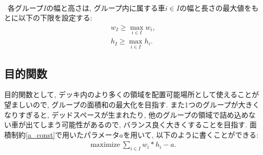 \\
\ 各グループ$I$の幅と高さは, グループ内に属する車$i \in I$の幅と長さの最大値をもとに以下の下限を設定する: \\
\begin{eqnarray}
    w_I \geq \max_{i \in I} w_i, \\
    h_I \geq \max_{i \in I} h_i. 
\end{eqnarray}


\subsection{目的関数}
目的関数として, デッキ内のより多くの領域を配置可能場所として使えることが望ましいので, グループの面積和の最大化を目指す. 
また1つのグループが大きくなりすぎると, デッドスペースが生まれたり, 他のグループの領域で詰め込めない車が出てしまう可能性があるので, バランス良く大きくすることを目指す. 
面積制約\ref{a_const}で用いたパラメータ$a$を用いて, 以下のように書くことができる: \\
\begin{eqnarray}
    \mathrm{maximize}\ \sum_{i \in I} w_i*h_i  - a. 
\end{eqnarray}
